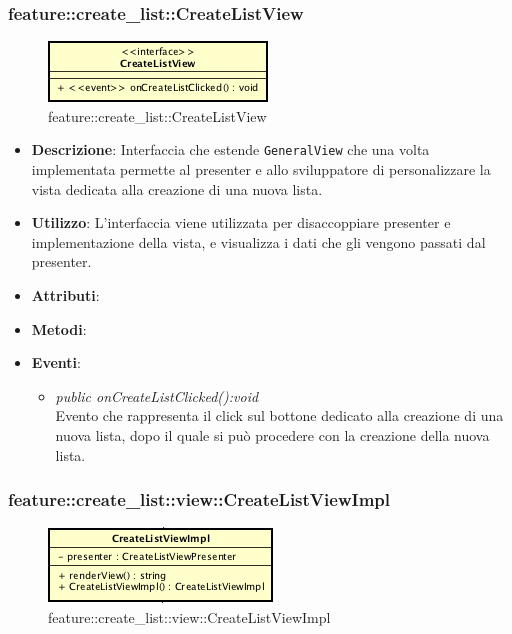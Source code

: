 \subsubsection{feature::create\_list::CreateListView}

\label{feature::create_list::CreateListView}
\begin{figure}[ht]
	\centering
	\includegraphics[scale=0.5]{Sezioni/SottosezioniST/img/app/CreateListView.png}
	\caption{feature::create\_list::CreateListView}
\end{figure}

\begin{itemize}
\item \textbf{Descrizione}: Interfaccia che estende \texttt{GeneralView} che una volta implementata permette al presenter e allo sviluppatore di personalizzare la vista dedicata alla creazione di una nuova lista.
\item \textbf{Utilizzo}: L'interfaccia viene utilizzata per disaccoppiare presenter e implementazione della vista, e visualizza i dati che gli vengono passati dal presenter.
\item \textbf{Attributi}:
\item \textbf{Metodi}:
\item \textbf{Eventi}:
	\begin{itemize}
	\item \textit{public onCreateListClicked():void}\\
	Evento che rappresenta il click sul bottone dedicato alla creazione di una nuova lista, dopo il quale si può procedere con la creazione della nuova lista.
	\end{itemize}
\end{itemize}

\subsubsection{feature::create\_list::view::CreateListViewImpl}

\label{feature::create_list::view::CreateListViewImpl}
\begin{figure}[ht]
	\centering
	\includegraphics[scale=0.5]{Sezioni/SottosezioniST/img/app/CreateListViewImpl.png}
	\caption{feature::create\_list::view::CreateListViewImpl}
\end{figure}

